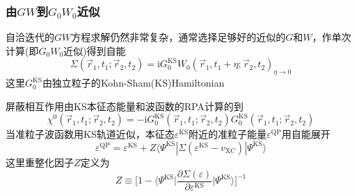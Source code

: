 \documentclass[cjk,slidestop,compress,mathserif,blue]{beamer}
\begin{document}
\frame
{
	\frametitle{由$GW$到$G_0W_0$近似}
	自洽迭代的$GW$方程求解仍然非常复杂，通常选择足够好的近似的$G$和$W$，作单次计算(即$G_0W_0$近似)得到自能
	$$\Sigma(\vec r_1,t_1;\vec r_2,t_2)=\mathrm{i}G_0^{\mathrm{KS}}W_0(\vec r_1,t_1+\eta;\vec r_2,t_2)_{\eta\rightarrow0}$$
	这里$G_0^{\mathrm{KS}}$由独立粒子的\textrm{Kohn-Sham(KS)}Hamiltonian

	屏蔽相互作用由\textrm{KS}本征态能量和波函数的\textrm{RPA}计算的到
	$$\chi^0(\vec r_1,t_1;\vec r_2,t_2)=-\mathrm{i}G_0^{\mathrm{KS}}(\vec r_1,t_1;\vec r_2,t_2)G_0^{\mathrm{KS}}(\vec r_1,t_1;\vec r_2,t_2)$$
	当准粒子波函数用\textrm{KS}轨道近似，本征态$\varepsilon^{\mathrm{KS}}$附近的准粒子能量$\varepsilon^{\mathrm{QP}}$用自能展开
	$$\varepsilon^{\mathrm{QP}}=\varepsilon^{\mathrm{KS}}+Z\langle\Psi^{\mathrm{KS}}|\Sigma(\varepsilon^{\mathrm{KS}}-v_{\mathrm{XC}})|\Psi^{\mathrm{KS}}\rangle$$
	这里重整化因子$Z$定义为$$Z\equiv\bigg[1-\langle\Psi^{\mathrm{KS}}\bigg|\dfrac{\partial\Sigma(\varepsilon)}{\partial\varepsilon^{\mathrm{KS}}}\bigg|\Psi^{\mathrm{KS}}\rangle\bigg]^{-1}$$
}

\end{document}
